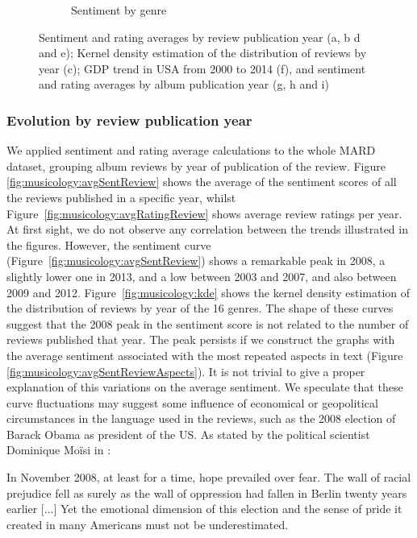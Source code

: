 \begin{figure}[ht!]
\begin{subfigure}{.32\textwidth}
        \caption{Sentiment by genre}
        \label{fig:musicology:avgSentimentGenresRelease}
    \end{subfigure}
    \caption{Sentiment and rating averages by review publication year (a, b d and e); Kernel density estimation of the distribution of reviews by year (c); GDP trend in USA from 2000 to 2014 (f), and sentiment and rating averages by album publication year (g, h and i)}
\end{figure}

\subsubsection{Evolution by review publication year}
\label{sec:musicology:evolution-review}

We applied sentiment and rating average calculations to the whole MARD dataset, grouping album reviews by year of publication of the review. Figure \ref{fig:musicology:avgSentReview} shows the average of the sentiment scores of all the reviews published in a specific year, whilst Figure~\ref{fig:musicology:avgRatingReview} shows average review ratings per year. At first sight, we do not observe any correlation between the trends illustrated in the figures. However, the sentiment curve (Figure~\ref{fig:musicology:avgSentReview}) shows a remarkable peak in 2008, a slightly lower one in 2013, and a low between 2003 and 2007, and also between 2009 and 2012. Figure~\ref{fig:musicology:kde} shows the kernel density estimation of the distribution of reviews by year of the 16 genres. The shape of these curves suggest that the 2008 peak in the sentiment score is not related to the number of reviews published that year. The peak persists if we construct the graphs with the average sentiment associated with the most repeated aspects in text (Figure \ref{fig:musicology:avgSentReviewAspects}). 
It is not trivial to give a proper explanation of this variations on the average sentiment. We speculate that these curve fluctuations may suggest some influence of economical or geopolitical circumstances in the language used in the reviews, such as the 2008 election of Barack Obama as president of the US. As stated by the political scientist Dominique Mo\"{i}si in \cite{Moisi2010}:

\begin{displayquote}\small{
In November 2008, at least for a time, hope prevailed over fear. The wall of racial prejudice fell as surely as the wall of oppression had fallen in Berlin twenty years earlier [...] Yet the emotional dimension of this election and the sense of pride it created in many Americans must not be underestimated.}
\end{displayquote}

